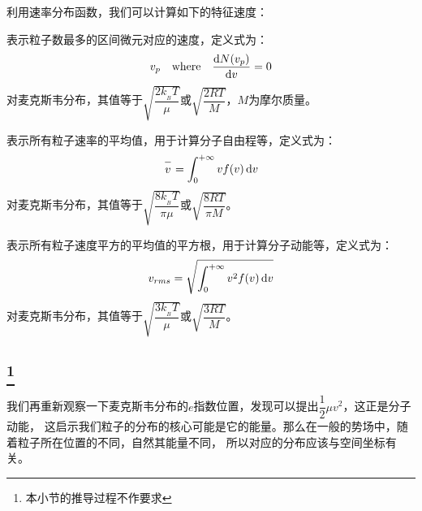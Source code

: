             利用速率分布函数，我们可以计算如下的特征速度：
            \begin{Itemize}
                \item {}表示粒子数最多的区间微元对应的速度，定义式为：
                \begin{equation}
                    v_{p} \quad \text{where} \quad \frac{\dif N({v_{p}})}{\dif{v}} = 0
                    \nonumber
                \end{equation}
                对麦克斯韦分布，其值等于$\sqrt{\dfrac{2k_{_B}T}{\mu}}$或$\sqrt{\dfrac{2RT}{M}}$，$M$为摩尔质量。
                \item {}表示所有粒子速率的平均值，用于计算分子自由程等，定义式为：
                \begin{equation}
                    \upperline{v} = \int_{0}^{+\infty} vf(v) \dif v
                    \nonumber
                \end{equation}
                对麦克斯韦分布，其值等于$\sqrt{\dfrac{8k_{_B}T}{\pi \mu}}$或$\sqrt{\dfrac{8RT}{\pi M}}$。
                \item {}表示所有粒子速度平方的平均值的平方根，用于计算分子动能等，定义式为：
                \begin{equation}
                    v_{rms} = \sqrt{\int_{0}^{+\infty} v^{2}f(v)\dif v}
                    \nonumber
                \end{equation}
                对麦克斯韦分布，其值等于$\sqrt{\dfrac{3k_{_B}T}{\mu}}$或$\sqrt{\dfrac{3RT}{M}}$。
            \end{Itemize}
        \subsection[玻尔兹曼分布]{\footnote{本小节的推导过程不作要求}}
            我们再重新观察一下麦克斯韦分布的$e$指数位置，发现可以提出$\dfrac{1}{2}\mu v^{2}$，这正是分子动能，
            这启示我们粒子的分布的核心可能是它的能量。那么在一般的势场中，随着粒子所在位置的不同，自然其能量不同，
            所以对应的分布应该与空间坐标有关。


